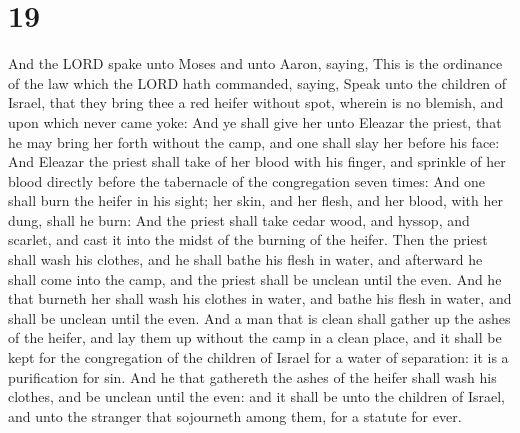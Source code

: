 \hypertarget{section-18}{%
\section{19}\label{section-18}}

 And the LORD spake unto Moses and unto Aaron, saying,
 This is the ordinance of the law which the LORD hath
commanded, saying, Speak unto the children of Israel, that they bring
thee a red heifer without spot, wherein is no blemish, and upon which
never came yoke:  And ye shall give her unto Eleazar the
priest, that he may bring her forth without the camp, and one shall slay
her before his face:  And Eleazar the priest shall take of
her blood with his finger, and sprinkle of her blood directly before the
tabernacle of the congregation seven times:  And one shall
burn the heifer in his sight; her skin, and her flesh, and her blood,
with her dung, shall he burn:  And the priest shall take
cedar wood, and hyssop, and scarlet, and cast it into the midst of the
burning of the heifer.  Then the priest shall wash his
clothes, and he shall bathe his flesh in water, and afterward he shall
come into the camp, and the priest shall be unclean until the even.
 And he that burneth her shall wash his clothes in water,
and bathe his flesh in water, and shall be unclean until the even.
 And a man that is clean shall gather up the ashes of the
heifer, and lay them up without the camp in a clean place, and it shall
be kept for the congregation of the children of Israel for a water of
separation: it is a purification for sin.  And he that
gathereth the ashes of the heifer shall wash his clothes, and be unclean
until the even: and it shall be unto the children of Israel, and unto
the stranger that sojourneth among them, for a statute for ever.

